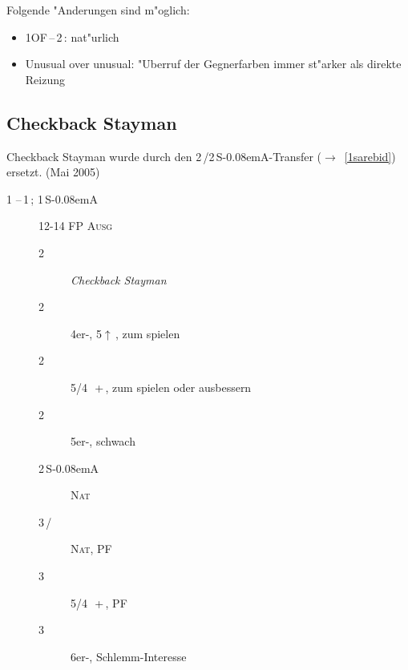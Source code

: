 \documentclass[11pt,german,twocolumn]{scrartcl}
\def\pik{\nobreak\,\Sp}
\def\coe{\nobreak\,\He}
\def\kar{\nobreak\,\Di}
\def\tre{\nobreak\,\Cl}
\def\pi{\Sp}
\def\mi{\,\Cl /\Di}
\def\ra{$\rightarrow$}
\def\pl{$\uparrow$}
\def\ofa{\nobreak\textsf{OF}}
\def\sa{\nobreak\textsf{S\kern-0.08emA}}
\def\SA{\nobreak\,\sa}
\def\sep{\nobreak\,--\,}
\newcommand{\conv}[1]{\emph{#1}}
\def\bal{\textsc{Ausg}}
\def\nat{\textsc{Nat}}
\def\pf{\textsc{PF}}
\def\bdsc{\begin{description}}
\def\edsc{\end{description}}
\begin{document}
\begin{appendix}
Folgende "Anderungen sind m"oglich:
%
\begin{itemize}
\item 1\ofa\sep2\tre: nat"urlich
\item Unusual over unusual: "Uberruf der Gegnerfarben immer st"arker als direkte Reizung
\end{itemize}

\subsection{Checkback Stayman}

Checkback Stayman wurde durch den 2\tre/2\SA-Transfer (\ra~\ref{1sarebid})
ersetzt. (Mai 2005)

\bdsc
\item[1\tre\sep1\pik; 1\SA] 12-14 FP \bal
  \bdsc
  \item[2\tre] \conv{Checkback Stayman}
  \item[2\kar] 4er-\pi, 5\pl{}\kar, zum spielen
  \item[2\coe] 5/4 \pik\,+\coe, zum spielen oder ausbessern
  \item[2\pik] 5er-\pi, schwach
  \item[2\SA] \nat
  \item[3\mi] \nat, \pf
  \item[3\coe] 5/4 \pik\,+\coe, \pf
  \item[3\pik] 6er-\pi, Schlemm-Interesse
  \edsc
\edsc
\end{appendix}
\printindex
\end{document}
